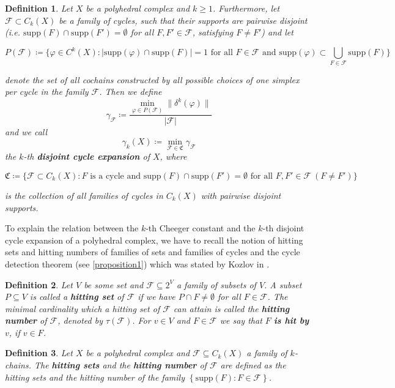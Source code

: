 \documentclass{article}
\newcommand{\supp}{\mathrm{supp}}
\newtheorem{defi}{Definition}[section]
\begin{document}
\begin{defi}
Let $X$ be a polyhedral complex and $k\geq 1$. Furthermore, let $\mathcal{F}\subset C_k(X)$ be a family of cycles, such that their supports are pairwise disjoint (i.e. $\supp(F)\cap\supp(F')=\emptyset$ for all $F,F'\in\mathcal{F}$, satisfying $F\neq F'$) and let
\begin{small}
\[
P(\mathcal{F})\coloneqq\{\varphi\in C^k(X):|\supp(\varphi)\cap\supp(F)|=1\text{ for all }F\in\mathcal{F}\text{ and }\supp(\varphi)\subset\bigcup\limits_{F\in\mathcal{F}}\supp(F)\}
\]
\end{small}
denote the set of all cochains constructed by all possible choices of one simplex per cycle in the family $\mathcal{F}$. Then we define
\[
\gamma_{\mathcal{F}}\coloneqq\frac{\min\limits_{\varphi\in P(\mathcal{F})}\|\delta^k(\varphi)\|}{|\mathcal{F}|}
\]
and we call
\[
\gamma_k(X)\coloneqq\min\limits_{\mathcal{F}\in\mathfrak{C}}\gamma_{\mathcal{F}}
\]
the $k$-th \textbf{disjoint cycle expansion} of $X$, where
\begin{small}
\[
\mathfrak{C}\coloneqq\{\mathcal{F}\subset C_k(X):F\text{ is a cycle and }\supp(F)\cap\supp(F')=\emptyset\text{ for all }F,F'\in\mathcal{F}\:(F\neq F')\}
\]
\end{small}
is the collection of all families of cycles in $C_k(X)$ with pairwise disjoint supports.
\end{defi}

To explain the relation between the $k$-th Cheeger constant and the $k$-th disjoint cycle expansion of a polyhedral complex, we have to recall the notion of hitting sets and hitting numbers of families of sets and families of cycles and the cycle detection theorem (see \ref{proposition1}) which was stated by Kozlov in \cite{1}.

\begin{defi}
Let $V$ be some set and $\mathcal{F}\subseteq 2^V$ a family of subsets of $V$. A subset $P\subseteq V$ is called a \textbf{hitting set} of $\mathcal{F}$ if we have $P\cap F\neq\emptyset$ for all $F\in\mathcal{F}$. The minimal cardinality which a hitting set of $\mathcal{F}$ can attain is called the \textbf{hitting number} of $\mathcal{F}$, denoted by $\tau(\mathcal{F})$. For $v\in V$ and $F\in\mathcal{F}$ we say that $F$ \textbf{is hit by} $v$, if $v\in F$.
\end{defi}

\begin{defi}
Let \(X\) be a polyhedral complex and \(\mathcal{F}\subseteq C_k(X)\) a family of \(k\)-chains. The \textbf{hitting sets} and the \textbf{hitting number} of \(\mathcal{F}\) are defined as the hitting sets and the hitting number of the family \(\left\{\supp(F):F\in\mathcal{F}\right\}\).
\end{defi}
\end{document}
